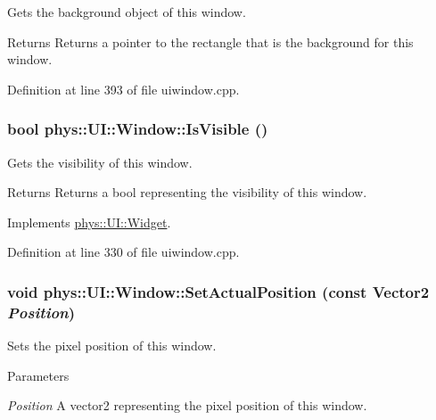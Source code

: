 Gets the background object of this window. 

\begin{DoxyReturn}{Returns}
Returns a pointer to the rectangle that is the background for this window. 
\end{DoxyReturn}


Definition at line 393 of file uiwindow.cpp.

\hypertarget{classphys_1_1UI_1_1Window_aa1d88c50c0965510b494b51f3e5a7bf0}{
\subsubsection[{IsVisible}]{\setlength{\rightskip}{0pt plus 5cm}bool phys::UI::Window::IsVisible ()}}
\label{d4/d86/classphys_1_1UI_1_1Window_aa1d88c50c0965510b494b51f3e5a7bf0}


Gets the visibility of this window. 

\begin{DoxyReturn}{Returns}
Returns a bool representing the visibility of this window. 
\end{DoxyReturn}


Implements \hyperlink{classphys_1_1UI_1_1Widget_aaf1a1bd31b8e626467ce9cdb69bdf7ac}{phys::UI::Widget}.



Definition at line 330 of file uiwindow.cpp.

\hypertarget{classphys_1_1UI_1_1Window_a2b8dfb4d8f2c730502ead6d1e8bb10e2}{
\subsubsection[{SetActualPosition}]{\setlength{\rightskip}{0pt plus 5cm}void phys::UI::Window::SetActualPosition (const {\bf Vector2} {\em Position})}}
\label{d4/d86/classphys_1_1UI_1_1Window_a2b8dfb4d8f2c730502ead6d1e8bb10e2}


Sets the pixel position of this window. 


\begin{DoxyParams}{Parameters}
\item[{\em Position}]A vector2 representing the pixel position of this window. \end{DoxyParams}


